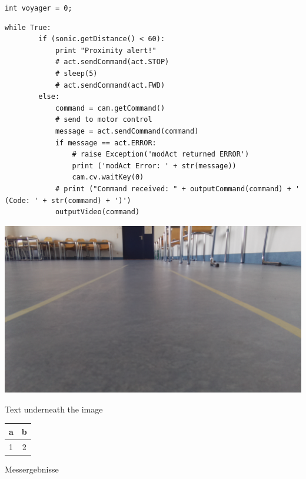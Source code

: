 \documentclass[a4paper,10pt]{article}
\begin{document}


    \lstinline{int voyager = 0;}

    \begin{lstlisting}[style=pythonStyle,label=python-02,caption=Python-Code]
    while True:
        if (sonic.getDistance() < 60):
            print "Proximity alert!"
            # act.sendCommand(act.STOP)
            # sleep(5)
            # act.sendCommand(act.FWD)
        else:
            command = cam.getCommand()
            # send to motor control
            message = act.sendCommand(command)
            if message == act.ERROR:
                # raise Exception('modAct returned ERROR')
                print ('modAct Error: ' + str(message))
                cam.cv.waitKey(0)
            # print ("Command received: " + outputCommand(command) + ' (Code: ' + str(command) + ')')
            outputVideo(command)
    \end{lstlisting}
 
    \begin{minipage}{\columnwidth}
      \makeatletter
      \def\@captype{figure}
      \makeatother
      \centering
      \includegraphics[width=0.8\linewidth]{images/image.png}
      \caption{Text underneath the image}
      \label{fig:image-01}
    \end{minipage}

    \begin{minipage}{\columnwidth}
      \makeatletter
      \def\@captype{table}
      \makeatother
      \centering
      \begin{tabular}{ l | c }
      a & b \\ \hline \hline
      1 & 2 \\
      \end{tabular}
      \caption{Messergebnisse}
      \label{tab:122}
    \end{minipage}
\end{document}
